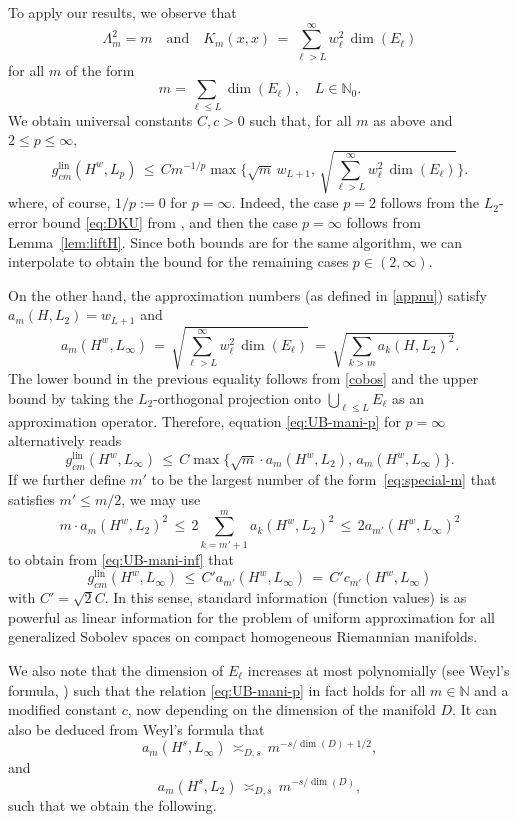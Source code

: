 \documentclass[a4paper,12pt]{amsart}
\theoremstyle{definition}
\theoremstyle{remark}
\newcommand{\lin}{\ensuremath{\mathrm{lin}}}
\begin{document}
{To apply our results, we observe that
\[
 \Lambda_m^2 = m \quad\text{and}\quad K_m(x,x)\,=\, \sum_{\ell>L}^\infty w_\ell^2\, \dim(E_\ell)
\]
for all $m$ of the form 
\begin{equation}\label{eq:special-m}
 m = \sum_{\ell\le L} \dim(E_\ell), \quad  L\in\mathbb{N}_0.
\end{equation}
We obtain universal constants $C,c>0$ such that,
for all $m$ as above 
and $2\le p \le \infty$,
\begin{equation}\label{eq:UB-mani-p}
 g_{cm}^\lin(H^w,L_p) \,\le\,  C m^{-1/p} \max\bigg\{ \sqrt{m}\,w_{L+1}, \, \sqrt{\sum_{\ell>L}^\infty w_\ell^2\, \dim(E_\ell)} \bigg\}.
\end{equation}
{where, of course, $1/p:=0$ for $p=\infty$.
Indeed, the case $p=2$ follows from the $L_2$-error bound \eqref{eq:DKU} from \cite[Thm.~23]{DKU}, and then the case $p=\infty$ follows from Lemma~\ref{lem:liftH}.
Since both bounds are for the same algorithm, we can interpolate to obtain the bound for the remaining cases $p\in(2,\infty)$.}

On the other hand, the approximation numbers (as defined in \eqref{appnu}) satisfy $a_m(H,L_2)=w_{L+1}$ and %
\[
a_m(H^w,L_\infty) %
 \,=\, \sqrt{\sum_{\ell>L}^\infty w_\ell^2\, \dim(E_\ell)}
 {\,=\, \sqrt{\sum_{k>m} a_k(H,L_2)^2}}.
\]
{The lower bound in the previous equality follows from \eqref{cobos}
and the upper bound by taking the $L_2$-orthogonal projection onto $\bigcup_{\ell \le L} E_\ell$ as an approximation operator.
Therefore,
equation \eqref{eq:UB-mani-p} 
for $p=\infty$} 
alternatively reads
\begin{equation}\label{eq:UB-mani-inf}
 g_{cm}^\lin(H^w,L_\infty) \,\le\, C \max\big\{ \sqrt{m} \cdot a_m(H^w,L_2) ,\,  a_m(H^w,L_\infty) \big\}.
\end{equation}
{If we further define $m'$ to be the largest number of the form~\eqref{eq:special-m}
that satisfies $m'\le m/2$,
we may use
\[
 m \cdot a_m(H^w,L_2)^2 \,\le\, 2 \sum_{k=m'+1}^m a_k(H^w,L_2)^2
 \,\le\, 2 a_{m'}(H^w,L_\infty)^2
\]
to obtain from \eqref{eq:UB-mani-inf} that
\[
 g_{cm}^\lin(H^w,L_\infty) \,\le\, C' a_{m'}(H^w,L_\infty)
 \,=\, C' c_{m'}(H^w,L_\infty)
\]
with $C'=\sqrt{2} C$.}
In this sense,
standard information (function values) is as powerful as linear information for the problem of uniform approximation for all generalized Sobolev spaces on compact homogeneous Riemannian manifolds.

We also note that 
the dimension of $E_\ell$ increases at most polynomially (see Weyl's formula, {\cite[eq.\,(1)]{Gin}})
such that the relation \eqref{eq:UB-mani-p} in fact holds for all $m\in\mathbb{N}$ 
and a modified constant $c$, 
now depending on the dimension of the manifold $D$.
It can also be deduced from Weyl's formula that
\[
a_m(H^s,L_\infty) \,\asymp_{D,s}\, m^{-s/\dim(D)+1/2},
\]
and
\[
a_m(H^s,L_2) \,\asymp_{D,s}\, m^{-s/\dim(D)},
\]
such that we obtain the following.

}
\end{document}
